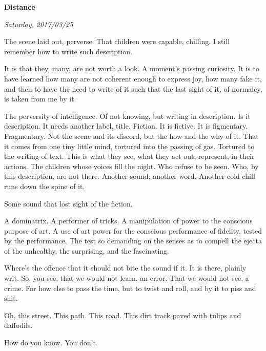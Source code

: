 

\centerline{\bf Distance}
\centerline{\it Saturday, 2017/03/25}



\vfill
\break


The scene laid out, perverse.  That children were capable, chilling.  I still remember how to write such description.

\vfill
\break


It is that they, many, are not worth a look.  A moment's passing
curiosity.  It is to have learned how many are not coherent enough to
express joy, how many fake it, and then to have the need to write of
it such that the last sight of it, of normalcy, is taken from me by
it.

\vfill
\break


The perversity of intelligence.  Of not knowing, but writing in
description.  Is it description.  It needs another label, title.
Fiction.  It is fictive.  It is figmentary.  Fragmentary.  Not the
scene and its discord, but the how and the why of it.  That it comes
from one tiny little mind, tortured into the passing of gas.  Tortured
to the writing of text.  This is what they see, what they act out,
represent, in their actions.  The children whose voices fill the
night.  Who refuse to be seen.  Who, by this description, are not
there.  Another sound, another word.  Another cold chill runs down the
spine of it.

Some sound that lost sight of the fiction.


\vfill
\break


A dominatrix.  A performer of tricks.  A manipulation of power to the
conscious purpose of art.  A use of art power for the conscious
performance of fidelity, tested by the performance.  The test so
demanding on the senses as to compell the ejecta of the unhealthy, the
surprising, and the fascinating.


\vfill
\break


Where's the offence that it should not bite the \break sound if it.  It is
there, plainly writ.  So, you see, that we would not learn, an error.
That we would not see, a crime.  For how else to pass the time, but to
twist and roll, and by it to piss and shit.


\vfill
\break


Oh, this street.  This path.  This road.  This dirt track paved with
tulips and daffodils.

How do you know.  You don't. 


